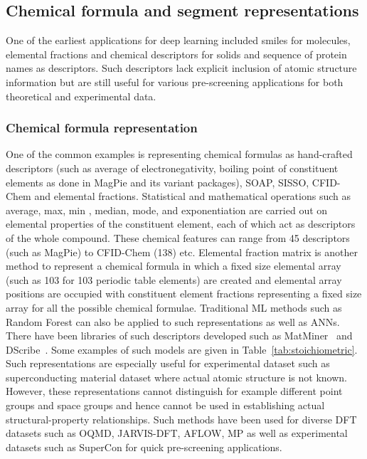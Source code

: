 \documentclass[pdflatex,sn-mathphys]{sn-jnl}%
\theoremstyle{thmstyleone}%
\theoremstyle{thmstyletwo}%
\theoremstyle{thmstylethree}%
\begin{document}
\subsection{Chemical formula and segment representations}\label{sec:stoichiometric}
One of the earliest applications for deep learning included smiles for molecules, elemental fractions and chemical descriptors for solids and sequence of protein names as descriptors. Such descriptors lack explicit inclusion of atomic structure information but are still useful for various pre-screening applications for both theoretical and experimental data. 

\subsubsection{Chemical formula representation}

One of the common examples is representing chemical formulas as hand-crafted descriptors (such as average of electronegativity, boiling point of constituent elements as done in MagPie and its variant packages), SOAP, SISSO, CFID-Chem and elemental fractions. Statistical and mathematical operations such as average, max, min , median, mode, and exponentiation are carried out on elemental properties of the constituent element, each of which act as descriptors of the whole compound. These chemical features can range from 45 descriptors (such as MagPie) to CFID-Chem (138) etc. Elemental fraction matrix is another method to represent a chemical formula in which a fixed size elemental array (such as 103 for 103 periodic table elements) are created and elemental array positions are occupied with constituent element fractions representing a fixed size array for all the possible chemical formulae. Traditional ML methods such as Random Forest can also be applied to such representations as well as ANNs. There have been libraries of such descriptors developed such as MatMiner~\cite{ward2018matminer} and DScribe~\cite{}. Some examples of such models are given in Table~\ref{tab:stoichiometric}. Such representations are especially useful for experimental dataset such as superconducting material dataset where actual atomic structure is not known. However, these representations cannot distinguish for example different point groups and space groups and hence cannot be used in establishing actual structural-property relationships. Such methods have been used for diverse DFT datasets such as OQMD, JARVIS-DFT, AFLOW, MP as well as experimental datasets such as SuperCon for quick pre-screening applications.
\end{document}
